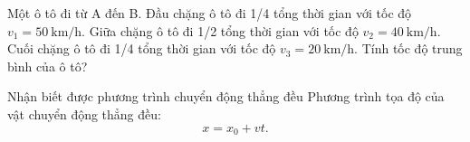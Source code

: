 \begin{vd}
	Một ô tô đi từ A đến B. Đầu chặng ô tô đi 1/4 tổng thời gian với tốc độ $v_1=\SI{50}{\kilo\meter/\hour}$. Giữa chặng ô tô đi 1/2 tổng thời gian với tốc độ $v_2=\SI{40}{\kilo\meter/\hour}$. Cuối chặng ô tô đi 1/4 tổng thời gian với tốc độ $v_3=\SI{20}{\kilo\meter/\hour}$. Tính tốc độ trung bình của ô tô?
\end{vd}
\begin{dang}{Nhận biết được phương trình chuyển động thẳng đều}
	Phương trình tọa độ của vật chuyển động thẳng đều:
	$$x=x_0+vt.$$
\end{dang}
